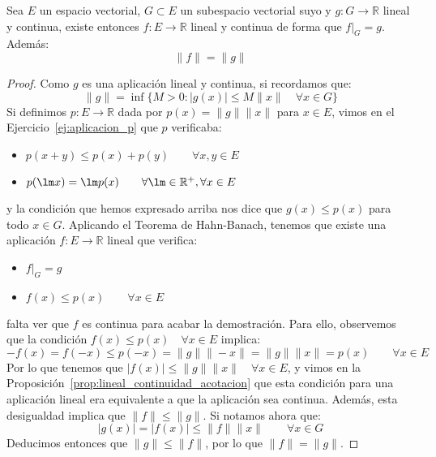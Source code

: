 \begin{coro}\label{coro:hahn-banach}
    Sea $E$ un espacio vectorial, $G\subset E$ un subespacio vectorial suyo y $g:G\to \mathbb{R}$ lineal y continua, existe entonces $f:E\to \mathbb{R}$ lineal y continua de forma que $f\big|_G = g$. Además:
    \begin{equation*}
        \|f\| = \|g\|
    \end{equation*}
    \begin{proof}
        Como $g$ es una aplicación lineal y continua, si recordamos que:
        \begin{equation*}
            \|g\| = \inf \{M>0 : |g(x)| \leq M\|x\| \quad \forall x\in G\}
        \end{equation*}
        Si definimos $p:E\to \mathbb{R}$ dada por $p(x) = \|g\|\|x\|$ para $x\in E$, vimos en el Ejercicio~\ref{ej:aplicacion_p} que $p$ verificaba:
        \begin{itemize}
            \item $p(x+y)\leq p(x) + p(y) \qquad \forall x,y\in E$
            \item $p(\lm x)=\lm p(x) \qquad \forall \lm \in \mathbb{R}^+, \forall x\in E$
        \end{itemize}
        y la condición que hemos expresado arriba nos dice que $g(x) \leq p(x)$ para todo $x\in G$. Aplicando el Teorema de Hahn-Banach, tenemos que existe una aplicación $f:E\to \mathbb{R}$ lineal que verifica:
        \begin{itemize}
            \item $f\big|_G = g$
            \item $f(x) \leq p(x)\qquad \forall x\in E$
        \end{itemize}
        falta ver que $f$ es continua para acabar la demostración. Para ello, observemos que la condición $f(x) \leq p(x) \quad \forall x\in E$ implica:
        \begin{equation*}
            -f(x) = f(-x) \leq p(-x) = \|g\|\|- x\| = \|g\|\|x\| = p(x) \qquad \forall x\in E
        \end{equation*}
        Por lo que tenemos que $|f(x)| \leq \|g\|\|x\| \quad \forall x\in E$, y vimos en la Proposición~\ref{prop:lineal_continuidad_acotacion} que esta condición para una aplicación lineal era equivalente a que la aplicación sea continua. Además, esta desigualdad implica que $\|f\| \leq \|g\|$. Si notamos ahora que:
        \begin{equation*}
            |g(x)| = |f(x)| \leq \|f\| \|x\| \qquad \forall x\in G
        \end{equation*}
        Deducimos entonces que $\|g\| \leq \|f\|$, por lo que $\|f\| = \|g\|$.
    \end{proof}
\end{coro}

